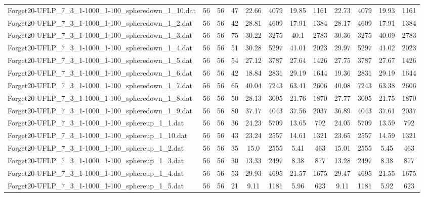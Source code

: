\begin{sidewaystable}[!ht]
{\begin{tabular}{lccccccccccc}
Forget20-UFLP\_7\_3\_1-1000\_1-100\_spheredown\_1\_10.dat & 56 & 56 & 47 & 22.66 & 4079 &  \textcolor{blue2}{19.85} & 1161 & 22.73 & 4079 & 19.93 & 1161 \\
Forget20-UFLP\_7\_3\_1-1000\_1-100\_spheredown\_1\_2.dat & 56 & 56 & 42 & 28.81 & 4609 & 17.91 & 1384 & 28.17 & 4609 & 17.91 & 1384 \\
Forget20-UFLP\_7\_3\_1-1000\_1-100\_spheredown\_1\_3.dat & 56 & 56 & 75 & 30.22 & 3275 & 40.1 & 2783 & 30.36 & 3275 & 40.09 & 2783 \\
Forget20-UFLP\_7\_3\_1-1000\_1-100\_spheredown\_1\_4.dat & 56 & 56 & 51 & 30.28 & 5297 & 41.01 & 2023 & 29.97 & 5297 & 41.02 & 2023 \\
Forget20-UFLP\_7\_3\_1-1000\_1-100\_spheredown\_1\_5.dat & 56 & 56 & 54 &  \textcolor{blue2}{27.12} & 3787 & 27.64 & 1426 & 27.75 & 3787 & 27.67 & 1426 \\
Forget20-UFLP\_7\_3\_1-1000\_1-100\_spheredown\_1\_6.dat & 56 & 56 & 42 & 18.84 & 2831 & 29.19 & 1644 & 19.36 & 2831 & 29.19 & 1644 \\
Forget20-UFLP\_7\_3\_1-1000\_1-100\_spheredown\_1\_7.dat & 56 & 56 & 65 & 40.04 & 7243 & 63.41 & 2606 & 40.08 & 7243 & 63.38 & 2606 \\
Forget20-UFLP\_7\_3\_1-1000\_1-100\_spheredown\_1\_8.dat & 56 & 56 & 50 & 28.13 & 3095 & 21.76 & 1870 & 27.77 & 3095 &  \textcolor{blue2}{21.75} & 1870 \\
Forget20-UFLP\_7\_3\_1-1000\_1-100\_spheredown\_1\_9.dat & 56 & 56 & 80 & 37.17 & 4043 & 37.56 & 2037 &  \textcolor{blue2}{36.89} & 4043 & 37.61 & 2037 \\
Forget20-UFLP\_7\_3\_1-1000\_1-100\_sphereup\_1\_1.dat & 56 & 56 & 36 & 24.23 & 5709 & 13.65 & 792 & 24.05 & 5709 &  \textcolor{blue2}{13.59} & 792 \\
Forget20-UFLP\_7\_3\_1-1000\_1-100\_sphereup\_1\_10.dat & 56 & 56 & 43 & 23.24 & 2557 & 14.61 & 1321 & 23.65 & 2557 & 14.59 & 1321 \\
Forget20-UFLP\_7\_3\_1-1000\_1-100\_sphereup\_1\_2.dat & 56 & 56 & 35 & 15.0 & 2555 &  \textcolor{blue2}{5.41} & 463 & 15.01 & 2555 & 5.45 & 463 \\
Forget20-UFLP\_7\_3\_1-1000\_1-100\_sphereup\_1\_3.dat & 56 & 56 & 30 & 13.33 & 2497 &  \textcolor{blue2}{8.38} & 877 & 13.28 & 2497 &  \textcolor{blue2}{8.38} & 877 \\
Forget20-UFLP\_7\_3\_1-1000\_1-100\_sphereup\_1\_4.dat & 56 & 56 & 53 & 29.93 & 4695 & 21.57 & 1675 & 29.47 & 4695 & 21.55 & 1675 \\
Forget20-UFLP\_7\_3\_1-1000\_1-100\_sphereup\_1\_5.dat & 56 & 56 & 21 & 9.11 & 1181 & 5.96 & 623 & 9.11 & 1181 &  \textcolor{blue2}{5.92} & 623 \\

\end{tabular}}
\end{sidewaystable}
